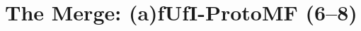 \cleardoublepage
\chapter{The Merge: (a)fUfI-ProtoMF (6--8)}   %
\label{ch:fufi}
\label{sec:fufi-build-order}   %


